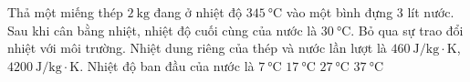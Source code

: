 \begin{ex}
Thả một miếng thép $\SI{2}{\kilogram}$ đang ở nhiệt độ $\SI{345}{\celsius}$ vào một bình đựng 3 lít nước. Sau khi cân bằng nhiệt, nhiệt độ cuối cùng của nước là $\SI{30}{\celsius}$. Bỏ qua sự trao đổi nhiệt với môi trường. Nhiệt dung riêng của thép và nước lần lượt là $\SI{460}{\joule/\kilogram\cdot\kelvin}$, $\SI{4200}{\joule/\kilogram\cdot\kelvin}$. Nhiệt độ ban đầu của nước là
	\choice
	{\True $\SI{7}{\celsius}$}
	{$\SI{17}{\celsius}$}
	{$\SI{27}{\celsius}$}
	{$\SI{37}{\celsius}$}
\end{ex}

